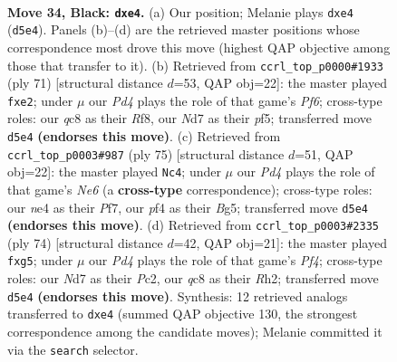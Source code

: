\documentclass[11pt]{article}
\begin{document}
\clearpage

\begin{figure}[p]\centering
\begin{subfigure}{0.46\textwidth}\centering
\resizebox{\linewidth}{!}{%
\newchessgame
\chessboard[
  setfen={2Q5/2pnkp1p/8/3p4/4NP2/8/6P1/R3R1K1 b - - 0 34},
  showmover=false,
  pgfstyle=straightmove, color=movearrow, markmove={d5-e4}
]}
\caption{}
\end{subfigure}\hfill
\begin{subfigure}{0.46\textwidth}\centering
\resizebox{\linewidth}{!}{%
\newchessgame
\chessboard[
  setfen={5r2/2k4p/8/p4P2/2P5/2K1Rp2/4N2P/8 b - - 0 36},
  showmover=false,
  pgfstyle=straightmove, color=movearrow, markmove={f3-e2}
]}
\caption{}
\end{subfigure}
\\[4pt]
\begin{subfigure}{0.46\textwidth}\centering
\resizebox{\linewidth}{!}{%
\newchessgame
\chessboard[
  setfen={6k1/5p2/6p1/1P1p2b1/8/R2Nn3/3r3P/1R4K1 b - - 0 38},
  showmover=false,
  pgfstyle=straightmove, color=movearrow, markmove={e3-c4}
]}
\caption{}
\end{subfigure}\hfill
\begin{subfigure}{0.46\textwidth}\centering
\resizebox{\linewidth}{!}{%
\newchessgame
\chessboard[
  setfen={6k1/8/4prr1/1N4n1/3p1P2/PP6/2PK3R/8 w - - 0 38},
  showmover=false,
  pgfstyle=straightmove, color=movearrow, markmove={f4-g5}
]}
\caption{}
\end{subfigure}
\caption{\textbf{Move 34, Black: \texttt{dxe4}.} (a) Our position; Melanie plays \texttt{dxe4} (\texttt{d5e4}). Panels (b)--(d) are the retrieved master positions whose correspondence most drove this move (highest QAP objective among those that transfer to it). (b) Retrieved from \texttt{ccrl\_top\_p0000\#1933} (ply 71) [structural distance $d$=53, QAP obj=22]: the master played \texttt{fxe2}; under $\mu$ our \emph{Pd4} plays the role of that game's \emph{Pf6}; cross-type roles: our \emph{q}c8 as their \emph{R}f8, our \emph{N}d7 as their \emph{p}f5; transferred move \texttt{d5e4} \textbf{(endorses this move)}. (c) Retrieved from \texttt{ccrl\_top\_p0003\#987} (ply 75) [structural distance $d$=51, QAP obj=22]: the master played \texttt{Nc4}; under $\mu$ our \emph{Pd4} plays the role of that game's \emph{Ne6} (a \textbf{cross-type} correspondence); cross-type roles: our \emph{n}e4 as their \emph{P}f7, our \emph{p}f4 as their \emph{B}g5; transferred move \texttt{d5e4} \textbf{(endorses this move)}. (d) Retrieved from \texttt{ccrl\_top\_p0003\#2335} (ply 74) [structural distance $d$=42, QAP obj=21]: the master played \texttt{fxg5}; under $\mu$ our \emph{Pd4} plays the role of that game's \emph{Pf4}; cross-type roles: our \emph{N}d7 as their \emph{P}c2, our \emph{q}c8 as their \emph{R}h2; transferred move \texttt{d5e4} \textbf{(endorses this move)}. Synthesis: 12 retrieved analogs transferred to \texttt{dxe4} (summed QAP objective 130, the strongest correspondence among the candidate moves); Melanie committed it via the \texttt{search} selector.}
\label{fig:thought-m67}
\end{figure}
\end{document}
